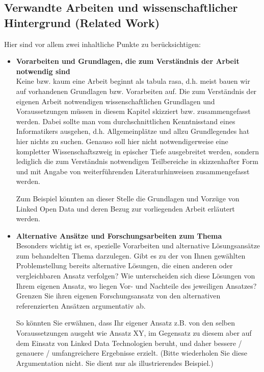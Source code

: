 \subsection{Verwandte Arbeiten und wissenschaftlicher Hintergrund (Related Work)}
Hier sind vor allem zwei inhaltliche Punkte zu berücksichtigen:
\begin{itemize}
\item {\bf Vorarbeiten und Grundlagen, die zum Verständnis der Arbeit notwendig sind}\\
Keine bzw. kaum eine Arbeit beginnt als \glqq tabula rasa\grqq , d.h. meist bauen wir auf  vorhandenen Grundlagen bzw. Vorarbeiten auf.
Die zum Verständnis der eigenen Arbeit notwendigen wissenschaftlichen Grundlagen und Voraussetzungen müssen in diesem Kapitel skizziert bzw. zusammengefasst werden.
Dabei sollte man vom durchschnittlichen Kenntnisstand eines Informatikers ausgehen, d.h. Allgemeinplätze und allzu Grundlegendes hat hier nichts zu suchen.
Genauso soll hier nicht notwendigerweise eine kompletter Wissenschaftszweig in epischer Tiefe ausgebreitet werden, sondern lediglich die zum Verständnis notwendigen Teilbereiche in skizzenhafter Form und mit Angabe von weiterführenden Literaturhinweisen zusammengefasst werden. 

\smallskip

Zum Beispiel könnten an dieser Stelle die Grundlagen und Vorzüge von Linked Open Data und deren Bezug zur vorliegenden Arbeit erläutert werden.

\smallskip

\item {\bf Alternative Ansätze und Forschungsarbeiten zum Thema}\\
Besonders wichtig ist es, spezielle Vorarbeiten und alternative Lösungsansätze zum behandelten Thema darzulegen.
Gibt es zu der von Ihnen gewählten Problemstellung bereits alternative Lösungen, die einen anderen oder vergleichbaren Ansatz verfolgen? Wie unterscheiden sich diese Lösungen von Ihrem eigenen Ansatz, wo liegen Vor- und Nachteile des jeweiligen Ansatzes? Grenzen Sie ihren eigenen Forschungsansatz von den alternativen referenzierten Ansätzen argumentativ ab.

\smallskip

So könnten Sie erwähnen, dass Ihr eigener Ansatz z.B. von den selben Voraussetzungen ausgeht wie Ansatz XY, im Gegensatz zu diesem aber auf dem Einsatz von Linked Data Technologien beruht, und daher bessere / genauere / umfangreichere Ergebnisse erzielt. (Bitte wiederholen Sie diese Argumentation nicht. Sie dient nur als illustrierendes Beispiel.)


\end{itemize}
